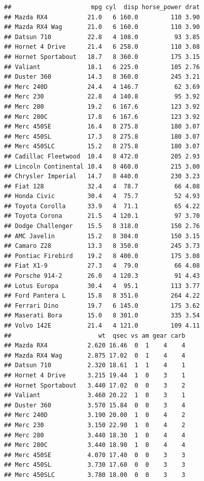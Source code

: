 \documentclass[]{book}
\begin{document}
\begin{verbatim}
##                      mpg cyl  disp horse_power drat
## Mazda RX4           21.0   6 160.0         110 3.90
## Mazda RX4 Wag       21.0   6 160.0         110 3.90
## Datsun 710          22.8   4 108.0          93 3.85
## Hornet 4 Drive      21.4   6 258.0         110 3.08
## Hornet Sportabout   18.7   8 360.0         175 3.15
## Valiant             18.1   6 225.0         105 2.76
## Duster 360          14.3   8 360.0         245 3.21
## Merc 240D           24.4   4 146.7          62 3.69
## Merc 230            22.8   4 140.8          95 3.92
## Merc 280            19.2   6 167.6         123 3.92
## Merc 280C           17.8   6 167.6         123 3.92
## Merc 450SE          16.4   8 275.8         180 3.07
## Merc 450SL          17.3   8 275.8         180 3.07
## Merc 450SLC         15.2   8 275.8         180 3.07
## Cadillac Fleetwood  10.4   8 472.0         205 2.93
## Lincoln Continental 10.4   8 460.0         215 3.00
## Chrysler Imperial   14.7   8 440.0         230 3.23
## Fiat 128            32.4   4  78.7          66 4.08
## Honda Civic         30.4   4  75.7          52 4.93
## Toyota Corolla      33.9   4  71.1          65 4.22
## Toyota Corona       21.5   4 120.1          97 3.70
## Dodge Challenger    15.5   8 318.0         150 2.76
## AMC Javelin         15.2   8 304.0         150 3.15
## Camaro Z28          13.3   8 350.0         245 3.73
## Pontiac Firebird    19.2   8 400.0         175 3.08
## Fiat X1-9           27.3   4  79.0          66 4.08
## Porsche 914-2       26.0   4 120.3          91 4.43
## Lotus Europa        30.4   4  95.1         113 3.77
## Ford Pantera L      15.8   8 351.0         264 4.22
## Ferrari Dino        19.7   6 145.0         175 3.62
## Maserati Bora       15.0   8 301.0         335 3.54
## Volvo 142E          21.4   4 121.0         109 4.11
##                        wt  qsec vs am gear carb
## Mazda RX4           2.620 16.46  0  1    4    4
## Mazda RX4 Wag       2.875 17.02  0  1    4    4
## Datsun 710          2.320 18.61  1  1    4    1
## Hornet 4 Drive      3.215 19.44  1  0    3    1
## Hornet Sportabout   3.440 17.02  0  0    3    2
## Valiant             3.460 20.22  1  0    3    1
## Duster 360          3.570 15.84  0  0    3    4
## Merc 240D           3.190 20.00  1  0    4    2
## Merc 230            3.150 22.90  1  0    4    2
## Merc 280            3.440 18.30  1  0    4    4
## Merc 280C           3.440 18.90  1  0    4    4
## Merc 450SE          4.070 17.40  0  0    3    3
## Merc 450SL          3.730 17.60  0  0    3    3
## Merc 450SLC         3.780 18.00  0  0    3    3

\end{verbatim}
\end{document}
